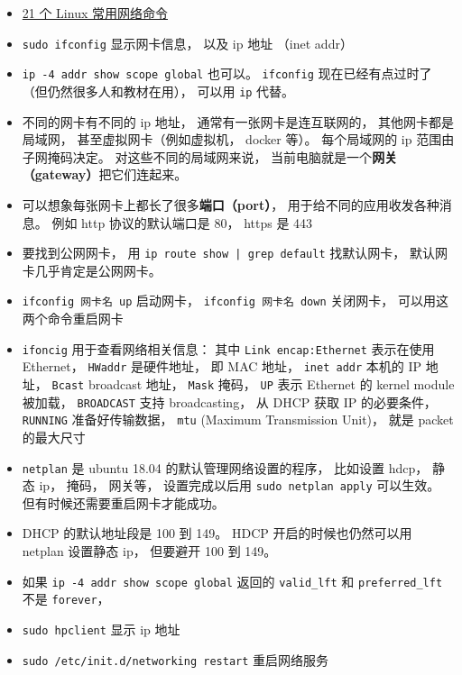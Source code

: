 
\begin{issues}
\issueDraft
\end{issues}

\begin{itemize}
\item \href{https://itsfoss.com/basic-linux-networking-commands/}{21 个 Linux 常用网络命令}
\item \verb`sudo ifconfig` 显示网卡信息， 以及 ip 地址 （inet addr）
\item \verb|ip -4 addr show scope global| 也可以。 \verb|ifconfig| 现在已经有点过时了（但仍然很多人和教材在用）， 可以用 \verb|ip| 代替。
\item 不同的网卡有不同的 ip 地址， 通常有一张网卡是连互联网的， 其他网卡都是局域网， 甚至虚拟网卡（例如虚拟机， docker 等）。 每个局域网的 ip 范围由子网掩码决定。 对这些不同的局域网来说， 当前电脑就是一个\textbf{网关（gateway）}把它们连起来。
\item 可以想象每张网卡上都长了很多\textbf{端口（port）}， 用于给不同的应用收发各种消息。 例如 http 协议的默认端口是 80， https 是 443
\item 要找到公网网卡， 用 \verb`ip route show | grep default` 找默认网卡， 默认网卡几乎肯定是公网网卡。
\item \verb`ifconfig 网卡名 up` 启动网卡， \verb`ifconfig 网卡名 down` 关闭网卡， 可以用这两个命令重启网卡
\item \verb`ifoncig` 用于查看网络相关信息： 其中 \verb`Link encap:Ethernet` 表示在使用 Ethernet， \verb`HWaddr` 是硬件地址， 即 MAC 地址， \verb`inet addr` 本机的 IP 地址， \verb`Bcast` broadcast 地址， \verb`Mask` 掩码， \verb`UP` 表示 Ethernet 的 kernel module 被加载， \verb`BROADCAST` 支持 broadcasting， 从 DHCP 获取 IP 的必要条件， \verb`RUNNING` 准备好传输数据， \verb`mtu` (Maximum Transmission Unit)， 就是 packet 的最大尺寸
\item \verb`netplan` 是 ubuntu 18.04 的默认管理网络设置的程序， 比如设置 hdcp， 静态 ip， 掩码， 网关等， 设置完成以后用 \verb`sudo netplan apply` 可以生效。 但有时候还需要重启网卡才能成功。
\item DHCP 的默认地址段是 100 到 149。 HDCP 开启的时候也仍然可以用 netplan 设置静态 ip， 但要避开 100 到 149。
\item 如果 \verb|ip -4 addr show scope global| 返回的 \verb|valid_lft| 和 \verb|preferred_lft| 不是 \verb|forever|， 
\item \verb`sudo hpclient` 显示 ip 地址
\item \verb`sudo /etc/init.d/networking restart` 重启网络服务 

\end{itemize}
